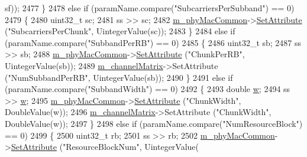 \begin{DoxyCode}
      sf));
2477         \}
2478         \textcolor{keywordflow}{else} \textcolor{keywordflow}{if} (paramName.compare(\textcolor{stringliteral}{"SubcarriersPerSubband"}) == 0)
2479         \{
2480                 uint32\_t sc;
2481                 ss >> sc;
2482                 \hyperlink{classns3_1_1MmWaveHelper_a6aaa35de743b9a88998de0128b1046b4}{m\_phyMacCommon}->\hyperlink{classns3_1_1ObjectBase_ac60245d3ea4123bbc9b1d391f1f6592f}{SetAttribute} (\textcolor{stringliteral}{"SubcarriersPerChunk"}, 
      UintegerValue(sc));
2483         \}
2484         \textcolor{keywordflow}{else} \textcolor{keywordflow}{if} (paramName.compare(\textcolor{stringliteral}{"SubbandPerRB"}) == 0)
2485         \{
2486                 uint32\_t sb;
2487                 ss >> sb;
2488                 \hyperlink{classns3_1_1MmWaveHelper_a6aaa35de743b9a88998de0128b1046b4}{m\_phyMacCommon}->\hyperlink{classns3_1_1ObjectBase_ac60245d3ea4123bbc9b1d391f1f6592f}{SetAttribute} (\textcolor{stringliteral}{"ChunkPerRB"}, UintegerValue(sb));
2489                 \hyperlink{classns3_1_1MmWaveHelper_a731a9e28a12edacd78b96800025db070}{m\_channelMatrix}->SetAttribute (\textcolor{stringliteral}{"NumSubbandPerRB"}, UintegerValue(sb));
2490         \}
2491         \textcolor{keywordflow}{else} \textcolor{keywordflow}{if} (paramName.compare(\textcolor{stringliteral}{"SubbandWidth"}) == 0)
2492         \{
2493                 \textcolor{keywordtype}{double} \hyperlink{lte_2model_2fading-traces_2fading__trace__generator_8m_afd61ec66f9d7b807eece6eb12c781844}{w};
2494                 ss >> \hyperlink{lte_2model_2fading-traces_2fading__trace__generator_8m_afd61ec66f9d7b807eece6eb12c781844}{w};
2495                 \hyperlink{classns3_1_1MmWaveHelper_a6aaa35de743b9a88998de0128b1046b4}{m\_phyMacCommon}->\hyperlink{classns3_1_1ObjectBase_ac60245d3ea4123bbc9b1d391f1f6592f}{SetAttribute} (\textcolor{stringliteral}{"ChunkWidth"}, DoubleValue(w));
2496                 \hyperlink{classns3_1_1MmWaveHelper_a731a9e28a12edacd78b96800025db070}{m\_channelMatrix}->SetAttribute (\textcolor{stringliteral}{"ChunkWidth"}, DoubleValue(w));
2497         \}
2498         \textcolor{keywordflow}{else} \textcolor{keywordflow}{if} (paramName.compare(\textcolor{stringliteral}{"NumResourceBlock"}) == 0)
2499         \{
2500                 uint32\_t rb;
2501                 ss >> rb;
2502                 \hyperlink{classns3_1_1MmWaveHelper_a6aaa35de743b9a88998de0128b1046b4}{m\_phyMacCommon}->\hyperlink{classns3_1_1ObjectBase_ac60245d3ea4123bbc9b1d391f1f6592f}{SetAttribute} (\textcolor{stringliteral}{"ResourceBlockNum"}, UintegerValue(

\end{DoxyCode}
